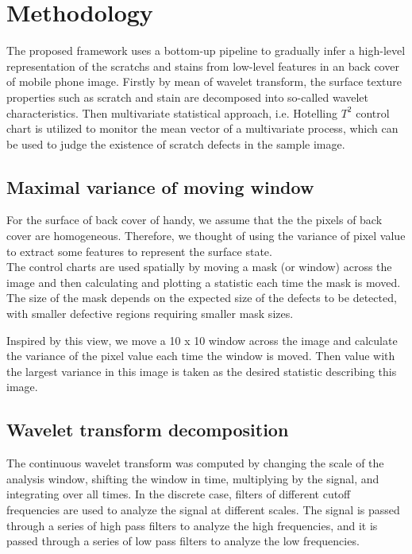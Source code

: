 \chapter{Methodology}
\label{cp:Methodology}

  The proposed framework uses a bottom-up pipeline to 
gradually infer a high-level representation of the scratchs and stains from low-level features in an back cover of mobile phone image. Firstly by mean of wavelet transform, the surface texture properties such as scratch and stain are decomposed into so-called wavelet characteristics. Then multivariate statistical approach, i.e. Hotelling $T^{2}$ control chart is utilized to monitor the mean vector of a multivariate process, which can be used to judge the existence of scratch defects in the sample image. 

\section{Maximal variance of moving window}
For the surface of back cover of handy, we assume that the the pixels of back cover are homogeneous. Therefore, we thought of using the variance of pixel value to extract some features to represent the surface state. \\

The control charts are used spatially by moving a mask (or window) across the image and then calculating and plotting a statistic each time the mask is moved. The size of the mask depends on the expected size of the defects to be detected, with smaller defective regions requiring smaller mask sizes.~\cite{megahed2011review}

Inspired by this view, we move a 10 x 10 window across the image and calculate the variance of the pixel value each time the window is moved. Then value with the largest variance in this image is taken as the desired statistic describing this image.

\section{Wavelet transform decomposition}
  The continuous wavelet transform was computed by changing the scale of the analysis window, shifting the window in time, multiplying by the signal, and integrating over all times. In the discrete case, filters of different cutoff frequencies are used to analyze the signal at different scales. The signal is passed through a series of high pass filters to analyze the high frequencies, and it is passed through a series of low pass filters to analyze the low frequencies.~\cite{polikarTHE WAVELET TUTORIALusing}



